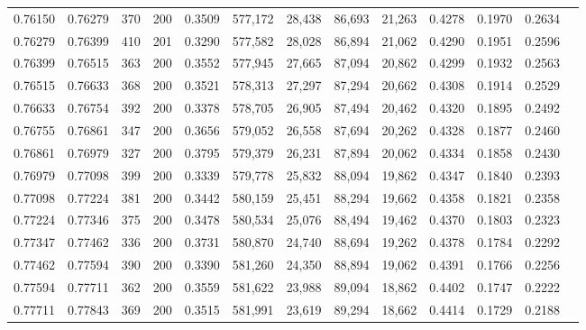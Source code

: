 \begin{tabular}{rrrrrrrrrrrrr}
0.76150 & 0.76279 &   370 & 200 &                                     0.3509 & 577,172 &  28,438 &  86,693 &  21,263 & 0.4278 & 0.1970 & 0.2634 \\
0.76279 & 0.76399 &   410 & 201 &                                     0.3290 & 577,582 &  28,028 &  86,894 &  21,062 & 0.4290 & 0.1951 & 0.2596 \\
0.76399 & 0.76515 &   363 & 200 &                                     0.3552 & 577,945 &  27,665 &  87,094 &  20,862 & 0.4299 & 0.1932 & 0.2563 \\
0.76515 & 0.76633 &   368 & 200 &                                     0.3521 & 578,313 &  27,297 &  87,294 &  20,662 & 0.4308 & 0.1914 & 0.2529 \\
0.76633 & 0.76754 &   392 & 200 &                                     0.3378 & 578,705 &  26,905 &  87,494 &  20,462 & 0.4320 & 0.1895 & 0.2492 \\
0.76755 & 0.76861 &   347 & 200 &                                     0.3656 & 579,052 &  26,558 &  87,694 &  20,262 & 0.4328 & 0.1877 & 0.2460 \\
0.76861 & 0.76979 &   327 & 200 &                                     0.3795 & 579,379 &  26,231 &  87,894 &  20,062 & 0.4334 & 0.1858 & 0.2430 \\
0.76979 & 0.77098 &   399 & 200 &                                     0.3339 & 579,778 &  25,832 &  88,094 &  19,862 & 0.4347 & 0.1840 & 0.2393 \\
0.77098 & 0.77224 &   381 & 200 &                                     0.3442 & 580,159 &  25,451 &  88,294 &  19,662 & 0.4358 & 0.1821 & 0.2358 \\
0.77224 & 0.77346 &   375 & 200 &                                     0.3478 & 580,534 &  25,076 &  88,494 &  19,462 & 0.4370 & 0.1803 & 0.2323 \\
0.77347 & 0.77462 &   336 & 200 &                                     0.3731 & 580,870 &  24,740 &  88,694 &  19,262 & 0.4378 & 0.1784 & 0.2292 \\
0.77462 & 0.77594 &   390 & 200 &                                     0.3390 & 581,260 &  24,350 &  88,894 &  19,062 & 0.4391 & 0.1766 & 0.2256 \\
0.77594 & 0.77711 &   362 & 200 &                                     0.3559 & 581,622 &  23,988 &  89,094 &  18,862 & 0.4402 & 0.1747 & 0.2222 \\
0.77711 & 0.77843 &   369 & 200 &                                     0.3515 & 581,991 &  23,619 &  89,294 &  18,662 & 0.4414 & 0.1729 & 0.2188 \\

\end{tabular}
